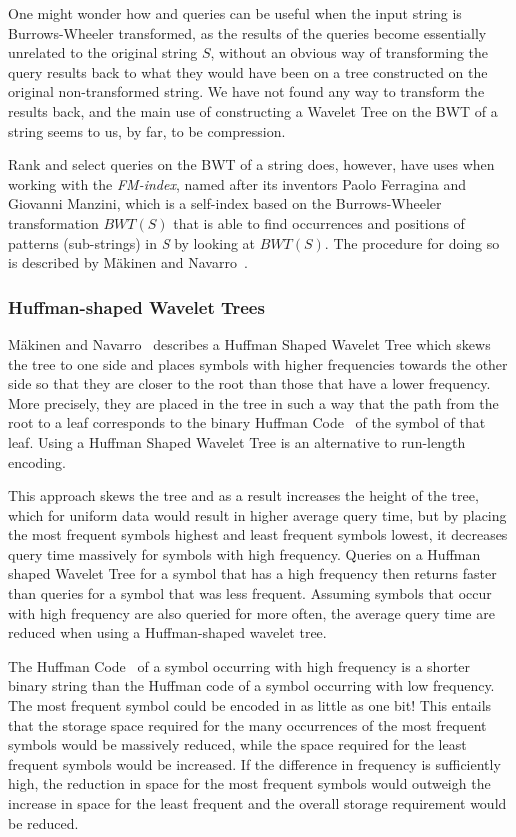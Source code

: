 One might wonder how  and  queries can be useful when the input string is Burrows-Wheeler transformed, as the results of the queries become essentially unrelated to the original string $S$, without an obvious way of transforming the query results back to what they would have been on a tree constructed on the original non-transformed string.
We have not found any way to transform the results back, and the main use of constructing a Wavelet Tree on the BWT of a string seems to us, by far, to be compression.

Rank and select queries on the BWT of a string does, however, have uses when working with the \textit{FM-index}, named after its inventors Paolo Ferragina and Giovanni Manzini, which is a self-index based on the Burrows-Wheeler transformation $BWT(S)$ that is able to find occurrences and positions of patterns (sub-strings) in \textit{S} by looking at $BWT(S)$. 
The procedure for doing so is described by Mäkinen and Navarro~.

\subsubsection{Huffman-shaped Wavelet Trees}
\label{sec:huffmanShapedWaveletTree}
Mäkinen and Navarro~ describes a Huffman Shaped Wavelet Tree which skews the tree to one side and places symbols with higher frequencies towards the other side so that they are closer to the root than those that have a lower frequency.
More precisely, they are placed in the tree in such a way that the path from the root to a leaf corresponds to the binary Huffman Code~ of the symbol of that leaf.
Using a Huffman Shaped Wavelet Tree is an alternative to run-length encoding.

This approach skews the tree and as a result increases the height of the tree, which for uniform data would result in higher average query time, but by placing the most frequent symbols highest and least frequent symbols lowest, it decreases query time massively for symbols with high frequency.
Queries on a Huffman shaped Wavelet Tree for a symbol that has a high frequency then returns faster than queries for a symbol that was less frequent.
Assuming symbols that occur with high frequency are also queried for more often, the average query time are reduced when using a Huffman-shaped wavelet tree.

The Huffman Code~ of a symbol occurring with high frequency is a shorter binary string than the Huffman code of a symbol occurring with low frequency.
The most frequent symbol could be encoded in as little as one bit!
This entails that the storage space required for the many occurrences of the most frequent symbols would be massively reduced, while the space required for the least frequent symbols would be increased.
If the difference in frequency is sufficiently high, the reduction in space for the most frequent symbols would outweigh the increase in space for the least frequent and the overall storage requirement would be reduced.

